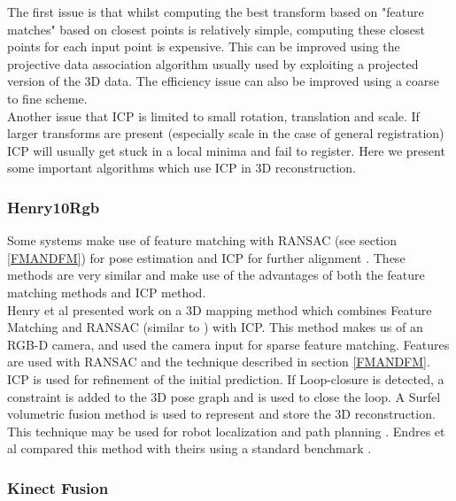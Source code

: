 The first issue is that whilst computing the best transform based on "feature matches" based on closest points is relatively simple, computing these closest points for each input point is expensive. This can be improved using the projective data association algorithm \cite{Blais95Registering} usually used by exploiting a projected version of the 3D data. The efficiency issue can also be improved using a coarse to fine scheme. \\

Another issue that ICP is limited to small rotation, translation and scale. If larger transforms are present (especially scale in the case of general registration) ICP will usually get stuck in a local minima and fail to register. Here we present some important algorithms which use ICP in 3D reconstruction.

\subsubsection{Henry10Rgb}

Some systems make use of feature matching with RANSAC (see section \ref{FMANDFM}) for pose estimation and ICP for further alignment \cite{Engelhard11Real, Henry10Rgb}. These methods are very similar and make use of the advantages of both the feature matching methods and ICP method. \\

Henry et al \cite{Henry10Rgb} presented work on a 3D mapping method which combines Feature Matching and RANSAC (similar to \cite{Endres12Evaluation}) with ICP. This method makes us of an RGB-D camera, and used the camera input for sparse feature matching. Features are used with RANSAC and the technique described in section \ref{FMANDFM}. ICP is used for refinement of the initial prediction. If Loop-closure is detected, a constraint is added to the 3D pose graph \cite{Kummerle11G} and is used to close the loop. A Surfel \cite{Pfister00Surfels} volumetric fusion method is used to represent and store the 3D reconstruction. This technique may be used for robot localization and path planning \cite{Hornung10Humanoid}. Endres et al \cite{Endres12Evaluation} compared this method with theirs using a standard benchmark \cite{Sturm12Benchmark}.  \\


\subsubsection{Kinect Fusion}

